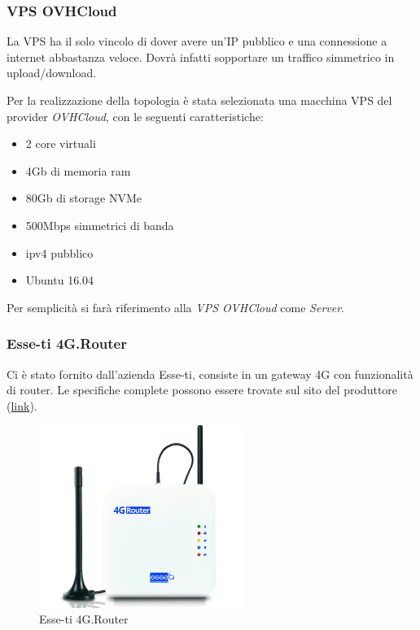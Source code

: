 \subsubsection{VPS OVHCloud}
\label{subsec:vps-ovhcloud}

La VPS ha il solo vincolo di dover avere un'IP pubblico e una connessione a internet abbastanza veloce. Dovrà infatti sopportare un traffico simmetrico in upload/download.

Per la realizzazione della topologia è stata selezionata una macchina VPS del provider \textit{OVHCloud}, con le seguenti caratteristiche:


\begin{itemize}[nosep]
	\item 2 core virtuali
	\item 4Gb di memoria ram
	\item 80Gb di storage NVMe
	\item 500Mbps simmetrici di banda
	\item ipv4 pubblico
	\item Ubuntu 16.04
\end{itemize}

Per semplicità si farà riferimento alla \textit{VPS OVHCloud} come \textit{Server}.

\subsubsection{Esse-ti 4G.Router}

Ci è stato fornito dall'azienda Esse-ti, consiste in un gateway 4G con funzionalità di router. Le specifiche complete possono essere trovate sul sito del produttore (\href{https://www.esse-ti.it/4g-router}{link}).


\begin{figure}[ht]
	\centering
	\includegraphics[width=250px]{immagini/4grouter.jpg}
	\caption{Esse-ti 4G.Router}
	\label{fig:esse-ti-router-4g}
\end{figure}

